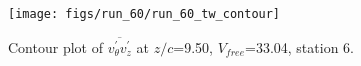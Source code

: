 \begin{figure}[H]
\centering
\texttt{[image: figs/run\_60/run\_60\_tw\_contour]}
\caption{Contour plot of $\overline{v_{\theta}^{\prime} v_{z}^{\prime}}$ at $z/c$=9.50, $V_{free}$=33.04, station 6.}
\label{fig:run_60_tw_contour}
\end{figure}


